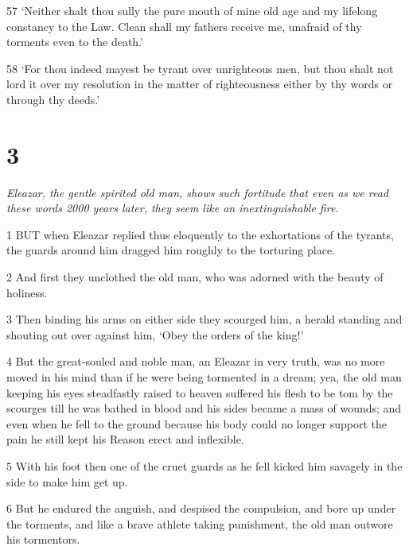 \par 57 ‘Neither shalt thou sully the pure mouth of mine old age and my lifelong constancy to the Law. Clean shall my fathers receive me, unafraid of thy torments even to the death.’

\par 58 ‘For thou indeed mayest be tyrant over unrighteous men, but thou shalt not lord it over my resolution in the matter of righteousness either by thy words or through thy deeds.’

\chapter{3}

\par \textit{Eleazar, the gentle spirited old man, shows such fortitude that even as we read these words 2000 years later, they seem like an inextinguishable fire.}

\par 1 BUT when Eleazar replied thus eloquently to the exhortations of the tyrants, the guards around him dragged him roughly to the torturing place.

\par 2 And first they unclothed the old man, who was adorned with the beauty of holiness.

\par 3 Then binding his arms on either side they scourged him, a herald standing and shouting out over against him, ‘Obey the orders of the king!’

\par 4 But the great-souled and noble man, an Eleazar in very truth, was no more moved in his mind than if he were being tormented in a dream; yea, the old man keeping his eyes steadfastly raised to heaven suffered his flesh to be tom by the scourges till he was bathed in blood and his sides became a mass of wounds; and even when he fell to the ground because his body could no longer support the pain he still kept his Reason erect and inflexible.

\par 5 With his foot then one of the cruet guards as he fell kicked him savagely in the side to make him get up.

\par 6 But he endured the anguish, and despised the compulsion, and bore up under the torments, and like a brave athlete taking punishment, the old man outwore his tormentors.


